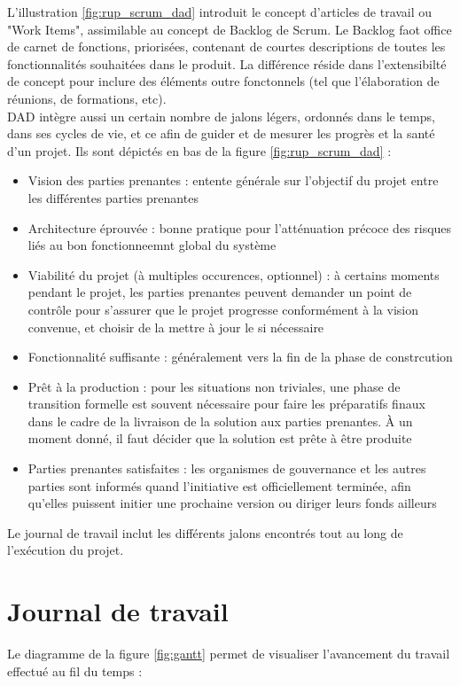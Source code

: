 \begin{spacing}{1.5}
L'illustration \ref{fig:rup_scrum_dad} introduit le concept d'articles de travail ou "Work Items", assimilable au concept de Backlog de Scrum. Le Backlog faot office de carnet de fonctions, priorisées, contenant de courtes descriptions de toutes les fonctionnalités souhaitées dans le produit. La différence réside dans l'extensibilté de concept pour inclure des éléments outre fonctonnels (tel que l'élaboration de réunions, de formations, etc).\\
DAD intègre aussi un certain nombre de jalons légers, ordonnés dans le temps, dans ses cycles de vie, et ce afin de guider et de mesurer les progrès et la santé d'un projet. Ils sont dépictés en bas de la figure \ref{fig:rup_scrum_dad} :
\begin{itemize}
    \item Vision des parties prenantes : entente générale sur l'objectif du projet entre les différentes parties prenantes
    \item Architecture éprouvée : bonne pratique pour l'atténuation précoce des risques liés au bon fonctionneemnt global du système
    \item Viabilité du projet (à multiples occurences, optionnel) :  à certains moments pendant le projet, les parties prenantes peuvent demander un point de contrôle pour s'assurer que le projet progresse conformément à la vision convenue, et choisir de la mettre à jour le si nécessaire
    \item Fonctionnalité suffisante : généralement vers la fin de la phase de constrcution
    \item Prêt à la production : pour les situations non triviales, une phase de transition formelle est souvent nécessaire pour faire les préparatifs finaux dans le cadre de la livraison de la solution aux parties prenantes. À un moment donné, il faut décider que la solution est prête à être produite
    \item Parties prenantes satisfaites : les organismes de gouvernance et les autres parties sont informés quand l'initiative est officiellement terminée, afin qu'elles puissent initier une prochaine version ou diriger leurs fonds ailleurs
\end{itemize}
Le journal de travail inclut les différents jalons encontrés tout au long de l'exécution du projet.


\section{Journal de travail}
Le diagramme de la figure \ref{fig:gantt} permet de visualiser l'avancement du travail effectué au fil du temps :


\end{spacing}

